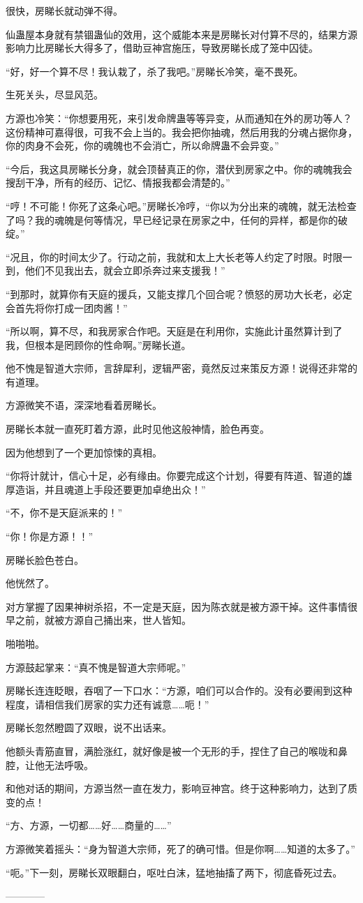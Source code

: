 \begin{this_body}
很快，房睇长就动弹不得。

仙蛊屋本身就有禁锢蛊仙的效用，这个威能本来是房睇长对付算不尽的，结果方源影响力比房睇长大得多了，借助豆神宫施压，导致房睇长成了笼中囚徒。

“好，好一个算不尽！我认栽了，杀了我吧。”房睇长冷笑，毫不畏死。

生死关头，尽显风范。

方源也冷笑：“你想要用死，来引发命牌蛊等等异变，从而通知在外的房功等人？这份精神可嘉得很，可我不会上当的。我会把你抽魂，然后用我的分魂占据你身，你的肉身不会死，你的魂魄也不会消亡，所以命牌蛊不会异变。”

“今后，我这具房睇长分身，就会顶替真正的你，潜伏到房家之中。你的魂魄我会搜刮干净，所有的经历、记忆、情报我都会清楚的。”

“哼！不可能！你死了这条心吧。”房睇长冷哼，“你以为分出来的魂魄，就无法检查了吗？我的魂魄是何等情况，早已经记录在房家之中，任何的异样，都是你的破绽。”

“况且，你的时间太少了。行动之前，我就和太上大长老等人约定了时限。时限一到，他们不见我出去，就会立即杀奔过来支援我！”

“到那时，就算你有天庭的援兵，又能支撑几个回合呢？愤怒的房功大长老，必定会首先将你打成一团肉酱！”

“所以啊，算不尽，和我房家合作吧。天庭是在利用你，实施此计虽然算计到了我，但根本是罔顾你的性命啊。”房睇长道。

他不愧是智道大宗师，言辞犀利，逻辑严密，竟然反过来策反方源！说得还非常的有道理。

方源微笑不语，深深地看着房睇长。

房睇长本就一直死盯着方源，此时见他这般神情，脸色再变。

因为他想到了一个更加惊悚的真相。

“你将计就计，信心十足，必有缘由。你要完成这个计划，得要有阵道、智道的雄厚造诣，并且魂道上手段还要更加卓绝出众！”

“不，你不是天庭派来的！”

“你！你是方源！！”

房睇长脸色苍白。

他恍然了。

对方掌握了因果神树杀招，不一定是天庭，因为陈衣就是被方源干掉。这件事情很早之前，就被方源自己捅出来，世人皆知。

啪啪啪。

方源鼓起掌来：“真不愧是智道大宗师呢。”

房睇长连连眨眼，吞咽了一下口水：“方源，咱们可以合作的。没有必要闹到这种程度，请相信我们房家的实力还有诚意……呃！”

房睇长忽然瞪圆了双眼，说不出话来。

他额头青筋直冒，满脸涨红，就好像是被一个无形的手，捏住了自己的喉咙和鼻腔，让他无法呼吸。

和他对话的期间，方源当然一直在发力，影响豆神宫。终于这种影响力，达到了质变的点！

“方、方源，一切都……好……商量的……”

方源微笑着摇头：“身为智道大宗师，死了的确可惜。但是你啊……知道的太多了。”

“呃。”下一刻，房睇长双眼翻白，呕吐白沫，猛地抽搐了两下，彻底昏死过去。

------------

\end{this_body}

